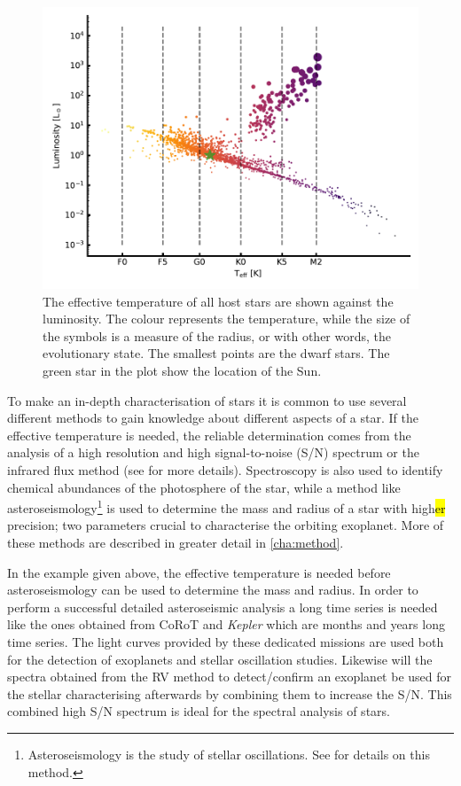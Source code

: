 \begin{figure}[htpb!]
    \centering
    \includegraphics[width=1.0\linewidth]{figures/hostDistribution.pdf}
    \caption{The effective temperature of all host stars are shown against the luminosity. The
             colour represents the temperature, while the size of the symbols is a measure of the
             radius, or with other words, the evolutionary state. The smallest points are the dwarf
             stars. The green star in the plot show the location of the Sun.}
    \label{fig:hostDistribution}
\end{figure}

To make an in-depth characterisation of stars it is common to use several different methods to gain
knowledge about different aspects of a star. If the effective temperature is needed, the reliable
determination comes from the analysis of a high resolution and high signal-to-noise (S/N) spectrum
or the infrared flux method (see  for more details). Spectroscopy is also used to
identify chemical abundances of the photosphere of the star, while a method like
asteroseismology\footnote{Asteroseismology is the study of stellar oscillations. See
 for details on this method.} is used to determine the mass and radius of
a star with high\hl{er} precision; two parameters crucial to characterise the orbiting exoplanet.
More of these methods are described in greater detail in \cref{cha:method}.

In the example given above, the effective temperature is needed before asteroseismology can be used
to determine the mass and radius. In order to perform a successful detailed asteroseismic analysis a
long time series is needed like the ones obtained from CoRoT and \emph{Kepler} which are months and
years long time series. The light curves provided by these dedicated missions are used both for the
detection of exoplanets and stellar oscillation studies. Likewise will the spectra obtained from the
RV method to detect/confirm an exoplanet be used for the stellar characterising afterwards by
combining them to increase the S/N. This combined high S/N spectrum is ideal for the spectral
analysis of stars.

